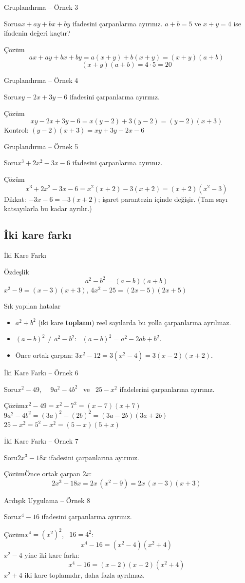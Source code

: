 \documentclass[aspectratio=169,11pt,handout]{beamer}
\newcommand{\soru}[3]{%
\begin{frame}{#1}
  \begin{block}{Soru}\large #2\end{block}
  \pause
  \begin{exampleblock}{Çözüm}\large #3\end{exampleblock}
\end{frame}}
\begin{document}
\soru{Gruplandırma -- Örnek 3}
{\(ax+ay+bx+by\) ifadesini çarpanlarına ayırınız. \(a+b=5\) ve \(x+y=4\) ise ifadenin değeri kaçtır?}
{\[ax+ay+bx+by=a(x+y)+b(x+y)=(x+y)(a+b)\]
\[(x+y)(a+b)=4\cdot 5=20\]}

\soru{Gruplandırma -- Örnek 4}
{\(xy-2x+3y-6\) ifadesini çarpanlarına ayırınız.}
{\[xy-2x+3y-6=x(y-2)+3(y-2)=(y-2)(x+3)\]
Kontrol: \((y-2)(x+3)=xy+3y-2x-6\) \checkmark}

\soru{Gruplandırma -- Örnek 5}
{\(x^3+2x^2-3x-6\) ifadesini çarpanlarına ayırınız.}
{\[x^3+2x^2-3x-6=x^2(x+2)-3(x+2)=(x+2)(x^2-3)\]
Dikkat: \(-3x-6=-3(x+2)\); işaret parantezin içinde değişir. (Tam sayı katsayılarla bu kadar ayrılır.)}

\subsection{İki kare farkı}
\begin{frame}{İki Kare Farkı}
\begin{block}{Özdeşlik}
\[a^2-b^2=(a-b)(a+b)\]
\(x^2-9=(x-3)(x+3)\), \quad \(4x^2-25=(2x-5)(2x+5)\)
\end{block}
\begin{alertblock}{Sık yapılan hatalar}
\begin{itemize}
\item \(a^2+b^2\) (iki kare \textbf{toplamı}) reel sayılarda bu yolla çarpanlarına ayrılmaz.
\item \((a-b)^2\neq a^2-b^2\): \ \((a-b)^2=a^2-2ab+b^2\).
\item Önce ortak çarpan: \(3x^2-12=3(x^2-4)=3(x-2)(x+2)\).
\end{itemize}
\end{alertblock}
\end{frame}

\soru{İki Kare Farkı -- Örnek 6}
{\(x^2-49\), \ \ \(9a^2-4b^2\) \ ve \ \(25-x^2\) ifadelerini çarpanlarına ayırınız.}
{\(x^2-49=x^2-7^2=(x-7)(x+7)\)\\[3pt]
\(9a^2-4b^2=(3a)^2-(2b)^2=(3a-2b)(3a+2b)\)\\[3pt]
\(25-x^2=5^2-x^2=(5-x)(5+x)\)}

\soru{İki Kare Farkı -- Örnek 7}
{\(2x^3-18x\) ifadesini çarpanlarına ayırınız.}
{Önce ortak çarpan \(2x\):
\[2x^3-18x=2x\,(x^2-9)=2x\,(x-3)(x+3)\]}

\soru{Ardışık Uygulama -- Örnek 8}
{\(x^4-16\) ifadesini çarpanlarına ayırınız.}
{\(x^4=(x^2)^2\), \ \(16=4^2\):
\[x^4-16=(x^2-4)(x^2+4)\]
\(x^2-4\) yine iki kare farkı:
\[x^4-16=(x-2)(x+2)(x^2+4)\]
\(x^2+4\) iki kare toplamıdır, daha fazla ayrılmaz.}
\end{document}
